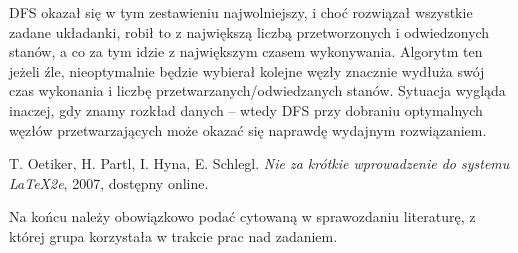 \documentclass{classrep}
\begin{document}
DFS okazał się w tym zestawieniu najwolniejszy, i choć rozwiązał wszystkie zadane układanki, robił to z największą liczbą przetworzonych i odwiedzonych stanów, a co za tym idzie z największym czasem wykonywania. Algorytm ten jeżeli źle, nieoptymalnie będzie wybierał kolejne węzły znacznie wydłuża swój czas wykonania i liczbę przetwarzanych/odwiedzanych stanów. Sytuacja wygląda inaczej, gdy znamy rozkład danych – wtedy DFS przy dobraniu optymalnych węzłów przetwarzających może okazać się naprawdę wydajnym rozwiązaniem.
\begin{thebibliography}{0}
   T. Oetiker, H. Partl, I. Hyna, E. Schlegl.
    \textsl{Nie za krótkie wprowadzenie do systemu \LaTeX2e}, 2007, dostępny
    online.
\end{thebibliography}

{\color{blue}
Na końcu należy obowiązkowo podać cytowaną w sprawozdaniu literaturę, z której
grupa korzystała w trakcie prac nad zadaniem.}
\end{document}
